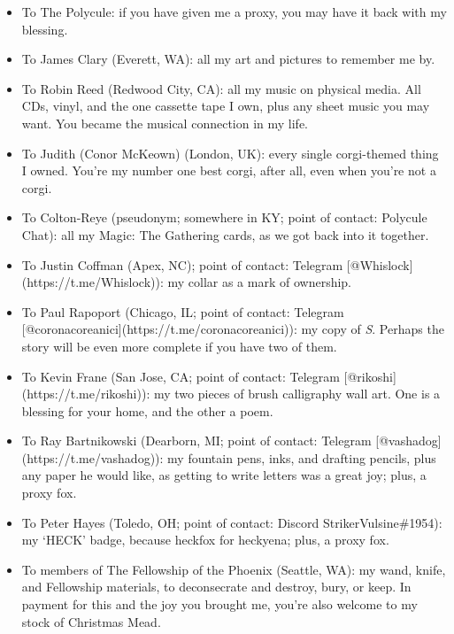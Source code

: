 \begin{enumerate}
  \begin{itemize}
  \tightlist
  \item
    To The Polycule: if you have given me a proxy, you may have it back with my blessing.
  \item
    To James Clary (Everett, WA): all my art and pictures to remember me by.
  \item
    To Robin Reed (Redwood City, CA): all my music on physical media. All CDs, vinyl, and the one cassette tape I own, plus any sheet music you may want. You became the musical connection in my life.
  \item
    To Judith (Conor McKeown) (London, UK): every single corgi-themed thing I owned. You're my number one best corgi, after all, even when you're not a corgi.
  \item
    To Colton-Reye (pseudonym; somewhere in KY; point of contact: Polycule Chat): all my Magic: The Gathering cards, as we got back into it together.
  \item
    To Justin Coffman (Apex, NC); point of contact: Telegram {[}@Whislock{]}(https://t.me/Whislock)): my collar as a mark of ownership.
  \item
    To Paul Rapoport (Chicago, IL; point of contact: Telegram {[}@coronacoreanici{]}(https://t.me/coronacoreanici)): my copy of \emph{S}. Perhaps the story will be even more complete if you have two of them.
  \item
    To Kevin Frane (San Jose, CA; point of contact: Telegram {[}@rikoshi{]}(https://t.me/rikoshi)): my two pieces of brush calligraphy wall art. One is a blessing for your home, and the other a poem.
  \item
    To Ray Bartnikowski (Dearborn, MI; point of contact: Telegram {[}@vashadog{]}(https://t.me/vashadog)): my fountain pens, inks, and drafting pencils, plus any paper he would like, as getting to write letters was a great joy; plus, a proxy fox.
  \item
    To Peter Hayes (Toledo, OH; point of contact: Discord StrikerVulsine\#1954): my `HECK' badge, because heckfox for heckyena; plus, a proxy fox.
  \item
    To members of The Fellowship of the Phoenix (Seattle, WA): my wand, knife, and Fellowship materials, to deconsecrate and destroy, bury, or keep. In payment for this and the joy you brought me, you're also welcome to my stock of Christmas Mead.
  \end{itemize}
\end{enumerate}

